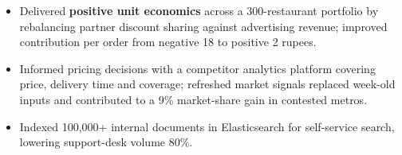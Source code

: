 \documentclass[letterpaper,10pt]{article}
\begin{document}
\begin{itemize}
\item Delivered \textbf{positive unit economics} across a 300-restaurant portfolio by rebalancing partner discount sharing against advertising revenue; improved contribution per order from negative 18 to positive 2 rupees.
\item Informed pricing decisions with a competitor analytics platform covering price, delivery time and coverage; refreshed market signals replaced week-old inputs and contributed to a 9\% market-share gain in contested metros.
\item Indexed 100,000+ internal documents in Elasticsearch for self-service search, lowering support-desk volume 80\%.
\end{itemize}
\end{document}
